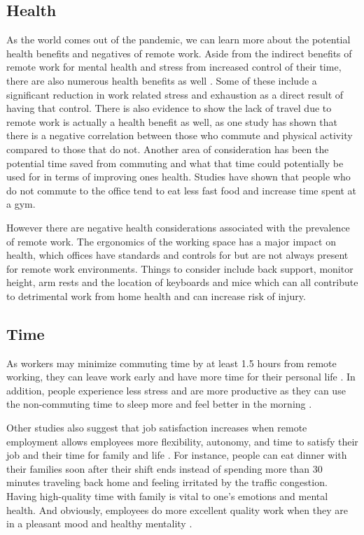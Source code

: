 \documentclass[12pt]{article}
\begin{document}
\subsection*{Health}

As the world comes out of the pandemic, we can learn more about the potential health benefits and negatives of remote work. Aside from the indirect benefits of remote work for mental health and stress from increased control of their time, there are also numerous health benefits as well \cite{doi:10.1177/1529100615593273}. Some of these include a significant reduction in work related stress and exhaustion as a direct result of having that control. There is also evidence to show the lack of travel due to remote work is actually a health benefit as well, as one study has shown that there is a negative correlation between those who commute and physical activity compared to those that do not\cite{HOEHNER2012571}. Another area of consideration has been the potential time saved from commuting and what that time could potentially be used for in terms of improving ones health. Studies have shown that people who do not commute to the office tend to eat less fast food and increase time spent at a gym\cite{allen2008workplace}. 

However there are negative health considerations associated with the prevalence of remote work. The ergonomics of the working space has a major impact on health, which offices have standards and controls for but are not always present for remote work environments. Things to consider include back support, monitor height, arm rests and the location of keyboards and mice which can all contribute to detrimental work from home health and can increase risk of injury\cite{ellison2012ergonomics}. 

\subsection*{Time}

As workers may minimize commuting time by at least 1.5 hours from remote working, they can leave work early and have more time for their personal life \cite{george2022}. In addition, people experience less stress and are more productive as they can use the non-commuting time to sleep more and feel better in the morning \cite{george2022}.

Other studies also suggest that job satisfaction increases when remote employment allows employees more flexibility, autonomy, and time to satisfy their job and their time for family and life \cite{natasha2016}. For instance, people can eat dinner with their families soon after their shift ends instead of spending more than 30 minutes traveling back home and feeling irritated by the traffic congestion. Having high-quality time with family is vital to one’s emotions and mental health. And obviously, employees do more excellent quality work when they are in a pleasant mood and healthy mentality \cite{natasha2016}.
\end{document}
